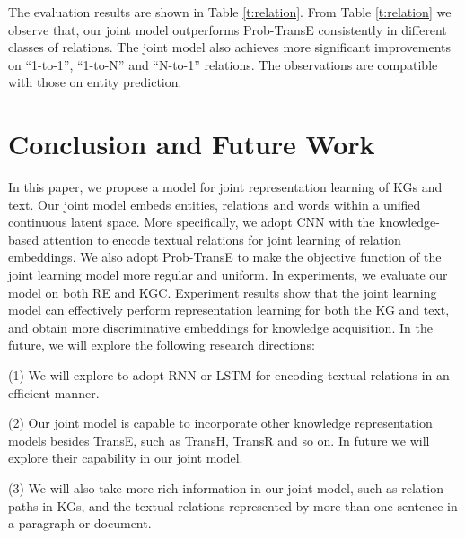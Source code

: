 \documentclass[11pt,a4paper]{article}
\begin{document}
The evaluation results are shown in Table \ref{t:relation}. From Table \ref{t:relation} we observe that, our joint model outperforms Prob-TransE consistently in different classes of relations. The joint model also achieves more significant improvements on ``1-to-1'', ``1-to-N'' and ``N-to-1'' relations. The observations are compatible with those on entity prediction.


\section{Conclusion and Future Work}

In this paper, we propose a model for joint representation learning of KGs and text. Our joint model embeds entities, relations and words within a unified continuous latent space. More specifically, we adopt CNN with the knowledge-based attention to encode textual relations for joint learning of relation embeddings. We also adopt Prob-TransE to make the objective function of the joint learning model more regular and uniform. In experiments, we evaluate our model on both RE and KGC. Experiment results show that the joint learning model can effectively perform representation learning for both the KG and text, and obtain more discriminative embeddings for knowledge acquisition. In the future, we will explore the following research directions: 

(1) We will explore to adopt RNN or LSTM for encoding textual relations in an efficient manner.

(2) Our joint model is capable to incorporate other knowledge representation models besides TransE, such as TransH, TransR and so on. In future we will explore their capability in our joint model. 

(3) We will also take more rich information in our joint model, such as relation paths in KGs, and the textual relations represented by more than one sentence in a paragraph or document.



\end{document}
